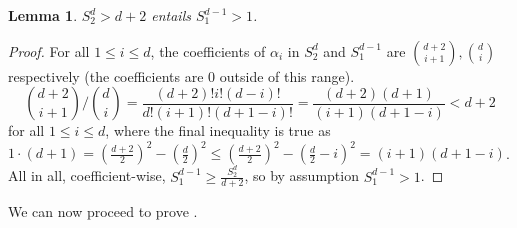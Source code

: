 \documentclass{article}
\theoremstyle{plain}
\newtheorem{lemma}[theorem]{Lemma}
\theoremstyle{definition}
\theoremstyle{remark}
\begin{document}
\begin{lemma}\label{lem:S2entS1}
    $S_2 ^d> d+2$ entails $S_1^{d-1}>1$.
\end{lemma}
\begin{proof}
    For all $1\le i\le d$, the coefficients of $\alpha_i$ in $S_2^d$ and $S_1^{d-1}$ are $\binom{d+2}{i+1},\binom{d}{i}$ respectively (the coefficients are $0$ outside of this range).
        $$\binom{d+2}{i+1}/\binom{d}{i}=\frac{(d+2)!i!(d-i)!}{d!(i+1)!(d+1-i)!}=\frac{(d+2)(d+1)}{(i+1)(d+1-i)}<d+2$$
        for all $1\le i\le d$, where the final inequality is true as $1\cdot(d+1)=(\frac{d+2}{2})^2-(\frac{d}{2})^2\le(\frac{d+2}{2})^2-(\frac{d}{2}-i)^2=(i+1)(d+1-i)$.
        All in all, coefficient-wise, $S_1^{d-1}\ge\frac{S_2^d}{d+2}$, so by assumption $S_1^{d-1}>1$. 
\end{proof}
We can now proceed to prove .
\end{document}
